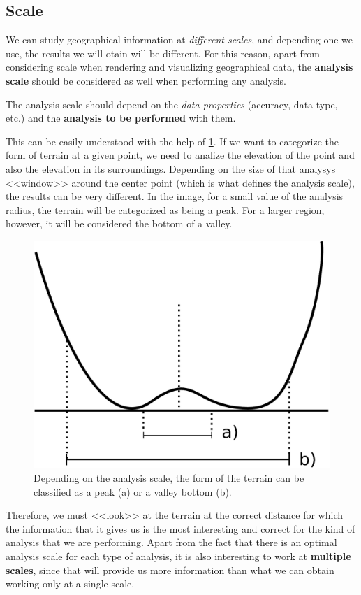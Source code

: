 \subsection{Scale}

We can study geographical information at \emph{different scales}, and depending one we use, the results we will otain will be different. For this reason, apart from considering scale when rendering and visualizing geographical data, the \textbf{analysis scale} should be considered as well when performing any analysis.

The analysis scale should depend on the \emph{data properties} (accuracy, data type, etc.) and the \textbf{analysis to be performed} with them.

This can be easily understood with the help of \ref{Fig:Scales}. If we want to categorize the form of terrain at a given point, we need to analize the elevation of the point and also the elevation in its surroundings. Depending on the size of that analysys <<window>> around the center point (which is what defines the analysis scale), the results can be very different. In the image, for a small value of the analysis radius, the terrain will be categorized as being a peak. For a larger region, however, it will be considered the bottom of a valley.



\begin{figure}[h]   
\centering
\includegraphics[width= .45\columnwidth]{Analysis/Scales.pdf}
\caption{\small Depending on the analysis scale, the form of the terrain can   be classified as a peak (a) or a valley bottom (b).}
\label{Fig:Scales} 
\end{figure}

Therefore, we must <<look>> at the terrain at the correct distance for which the information that it gives us is the most interesting and correct for the kind of analysis that we are performing. Apart from the fact that there is an optimal analysis scale for each type of analysis, it is also interesting to work at \textbf{multiple scales}, since that will provide us more information than what we can obtain working only at a single scale.

